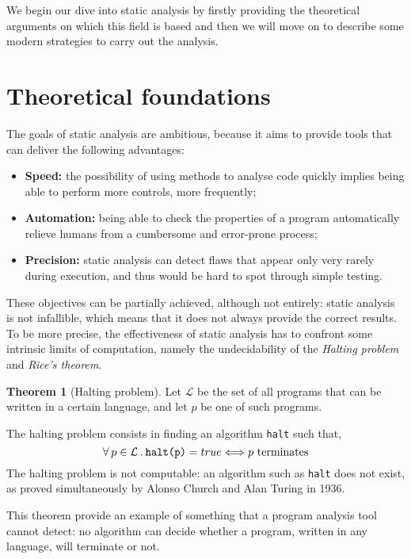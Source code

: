 \documentclass[12pt,a4paper]{book}
\newcommand{\st}{\hspace{2px}.\hspace{2px}}
\theoremstyle{definition}
\begin{document}
	We begin our dive into static analysis by firstly providing the theoretical arguments on which this field is based and then we will move on to describe some modern strategies to carry out the analysis.
	\section{Theoretical foundations}
	The goals of static analysis are ambitious, because it aims to provide tools that can deliver the following advantages:
	\begin{itemize}
		\item \textbf{Speed:} the possibility of using methods to analyse code quickly implies being able to perform more controls, more frequently; 
		\item \textbf{Automation:} being able to check the properties of a program automatically relieve humans from a cumbersome and error-prone process;
		\item \textbf{Precision:} static analysis can detect flaws that appear only very rarely during execution, and thus would be hard to spot through simple testing.
	\end{itemize}
	These objectives can be partially achieved, although not entirely:  static analysis is not infallible, which means that it does not always provide the correct results. To be more precise, the effectiveness of static analysis has to confront some intrinsic limits of computation, namely the undecidability of the \textit{Halting problem} and \textit{Rice's theorem}. 
	\theoremstyle{theorem}
	\newtheorem{thm}{Theorem}
	\begin{thm}[Halting problem] Let $\mathcal{L}$ be the set of all programs that can be written in a certain language, and let $p$ be one of such programs. 
		
		The halting problem consists in finding an algorithm \texttt{halt} such that,  
		\[
		\forall\hspace{2px}p\in\mathcal{L}\st\texttt{halt(p)} = true \Longleftrightarrow p\text{ terminates}
		\]
		The halting problem is not computable: an algorithm such as \texttt{halt} does not exist, as proved simultaneously by Alonso Church \cite{Church1936} and Alan Turing \cite{Turing1937} in 1936.
	\end{thm}
	This theorem provide an example of something that a program analysis tool cannot detect: no algorithm can decide whether a program, written in any language, will terminate or not.
	
\end{document}

